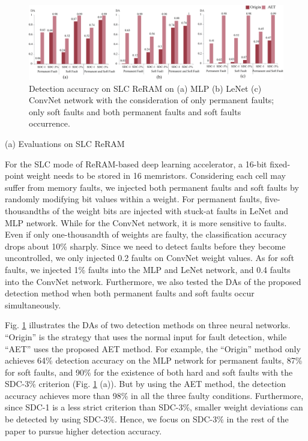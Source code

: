 \begin{figure}
    \centering
    \includegraphics[width=1\linewidth]{images/OL-fig10}
    \vspace{-20pt}
    \caption{Detection accuracy on SLC ReRAM on (a) MLP (b) LeNet (c) ConvNet network with the consideration of only permanent faults; only soft faults and both permanent faults and soft faults occurrence.}
    \label{fig:mnist-slc}
    \vspace{-15pt}
\end{figure}


(a) Evaluations on SLC ReRAM 

For the SLC mode of ReRAM-based deep learning accelerator,  a 16-bit fixed-point weight needs to be stored in 16 memristors. Considering each cell may suffer from memory faults, we injected both permanent faults and soft faults by randomly modifying bit values within a weight. 
For permanent faults,  five-thousandths of the weight bits are injected with stuck-at faults in LeNet and MLP network. While for the ConvNet network, it is more sensitive to faults. Even if only one-thousandth of weights are faulty,  the classification accuracy drops about 10\% sharply. Since we need to detect faults before they become uncontrolled, we only injected {0.2\textperthousand} faults on ConvNet weight values. As for soft faults, we injected 1\% faults into the MLP and LeNet network, and {0.4\textperthousand} faults into the ConvNet network. Furthermore, we also tested the DAs of the proposed detection method when both permanent faults and soft faults occur simultaneously.

Fig. \ref{fig:mnist-slc} illustrates the DAs of two detection methods on three neural networks. ``Origin'' is the strategy that uses the normal input for fault detection, while ``AET'' uses the proposed AET method. For example, the ``Origin'' method only achieves 64\% detection accuracy on the MLP network for permanent faults, 87\% for soft faults, and 90\% for the existence of both hard and soft faults with the SDC-3\% criterion (Fig. \ref{fig:mnist-slc} (a)). But by using the AET method, the detection accuracy achieves more than 98\% in all the three faulty conditions.  Furthermore, since SDC-1 is a less strict criterion than SDC-3\%, smaller weight deviations can be detected by using SDC-3\%. Hence, we focus on SDC-3\% in the rest of the paper to pursue higher detection accuracy. 

